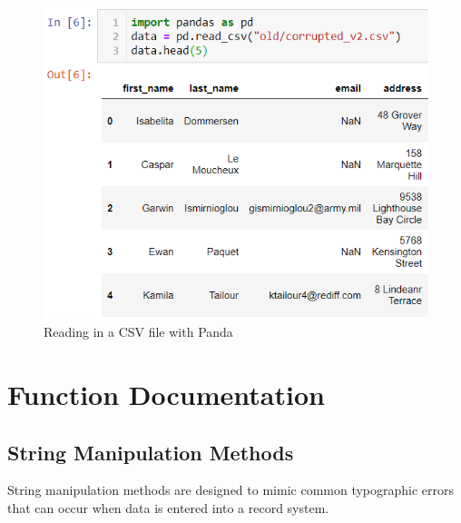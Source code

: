 \documentclass[titlepage, 11pt]{article}
\begin{document}
\begin{figure}[H]
    \centering
    \includegraphics{imgs/PandasRead.png}
    \caption{Reading in a CSV file with Panda}
    \label{fig:my_label}
\end{figure}

\section{Function Documentation}



\newcommand{\parmdesc}[2]{\textit{#1} - #2}

\newcommand{\docdata}{\parmdesc{data}{The Pandas DataFrame to be modified. The DataFrame will be modified in-place.}}

\newcommand{\docindc}{\parmdesc{indicators}{A sparse matrix containing information about modified entries in the DataFrame.}}

\newcommand{\doccols}{\parmdesc{columns}{An optional list of columns to operate on. These columns should correspond to column names in the DataFrame being operated on. If this parameter is not passed, defaults to operating on all of the columns in the DataFrame.}}


\subsection{String Manipulation Methods}\label{stringmanip}
String manipulation methods are designed to mimic common typographic errors that can occur when data is entered into a record system.
\end{document}
